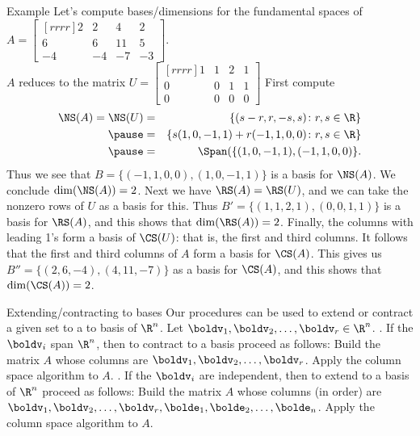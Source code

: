 \begin{frame}{Example}
\footnotesize
Let's compute bases/dimensions for the fundamental spaces of \\ 
$A=\begin{bmatrix}[rrrr]
2&2&4&2\\
6&6&11&5\\
-4&-4&-7&-3
\end{bmatrix}
$.\\
\pause $A$ reduces to the matrix 
$U=\begin{bmatrix}[rrrr]
1&1&2&1\\
0&0&1&1\\
0&0&0&0
\end{bmatrix}
$
\bpause
First compute 
\begin{eqnarray*}
\NS(A)=\NS(U)&=&\{(s-r,r,-s,s)\colon r, s\in\R\}\\
\pause&=&\{s(1,0,-1,1)+r(-1,1,0,0)\colon r,s\in\R\}\\
\pause&=&\Span(\{(1,0,-1,1),(-1,1,0,0)\}.\end{eqnarray*} 
Thus we see that $B=\{(-1,1,0,0), (1,0,-1,1)\}$ is a basis for $\NS(A)$. We conclude $\dim(\NS(A))=2$. 
\bpause
Next we have $\RS(A)=\RS(U)$, and we can take the nonzero rows of $U$ as a basis for this. Thus $B'=\{(1,1,2,1),(0,0,1,1)\}$ is a basis for $\RS(A)$, and this shows that $\dim(\RS(A))=2$. 
\bpause Finally, the columns with leading 1's form a basis of $\CS(U)$: that is, the first and third columns. It follows that the first and third columns of $A$ form a basis for $\CS(A)$. This gives us $B''=\{(2,6,-4), (4,11,-7)\}$ as a basis for $\CS(A)$, and this shows that  $\dim(\CS(A))=2$. 
\end{frame}
\begin{frame}{Extending/contracting to bases}
Our procedures can be used to extend or contract a given set to a to basis of $\R^n$.
\bpause
Let $\boldv_1,\boldv_2, \dots, \boldv_r\in \R^n$. 
\bb
{}. If the $\boldv_i$ span $\R^n$, then to contract to a basis proceed as follows:
\bb
\ii Build the matrix $A$ whose columns are $\boldv_1, \boldv_2, \dots, \boldv_r$. 
\ii Apply the column space algorithm to $A$. 
\ee
{}. If the $\boldv_i$ are independent, then to extend to a basis of $\R^n$ proceed as follows:
\bb
\ii Build the matrix $A$ whose columns (in order) are $\boldv_1,\boldv_2, \dots, \boldv_r, \bolde_1,\bolde_2,\dots, \bolde_n$.
\ii Apply the column space algorithm to $A$. 
\ee

\ee
\end{frame}
